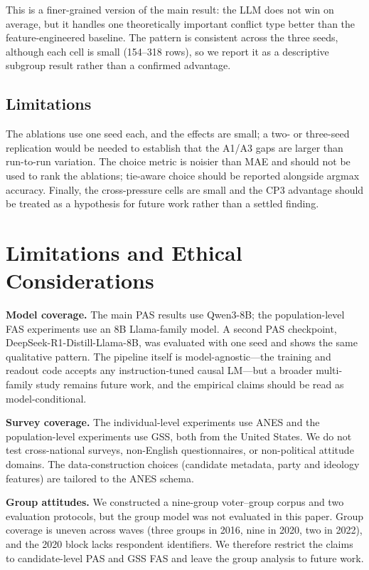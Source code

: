 This is a finer-grained version of the main result: the LLM does not win
on average, but it handles one theoretically important conflict type
better than the feature-engineered baseline. The pattern is consistent
across the three seeds, although each cell is small (154--318 rows), so
we report it as a descriptive subgroup result rather than a confirmed
advantage.

\subsection{Limitations}\label{limitations}

The ablations use one seed each, and the effects are small; a two- or
three-seed replication would be needed to establish that the A1/A3 gaps
are larger than run-to-run variation. The choice metric is noisier than
MAE and should not be used to rank the ablations; tie-aware choice
should be reported alongside argmax accuracy. Finally, the
cross-pressure cells are small and the CP3 advantage should be treated
as a hypothesis for future work rather than a settled finding.

\section{Limitations and Ethical
Considerations}\label{limitations-and-ethical-considerations}

\textbf{Model coverage.} The main PAS results use Qwen3-8B; the
population-level FAS experiments use an 8B Llama-family model. A second
PAS checkpoint, DeepSeek-R1-Distill-Llama-8B, was evaluated with one
seed and shows the same qualitative pattern. The pipeline itself is
model-agnostic---the training and readout code accepts any
instruction-tuned causal LM---but a broader multi-family study remains
future work, and the empirical claims should be read as
model-conditional.

\textbf{Survey coverage.} The individual-level experiments use ANES and
the population-level experiments use GSS, both from the United States.
We do not test cross-national surveys, non-English questionnaires, or
non-political attitude domains. The data-construction choices (candidate
metadata, party and ideology features) are tailored to the ANES schema.

\textbf{Group attitudes.} We constructed a nine-group voter--group
corpus and two evaluation protocols, but the group model was not
evaluated in this paper. Group coverage is uneven across waves (three
groups in 2016, nine in 2020, two in 2022), and the 2020 block lacks
respondent identifiers. We therefore restrict the claims to
candidate-level PAS and GSS FAS and leave the group analysis to future
work.


